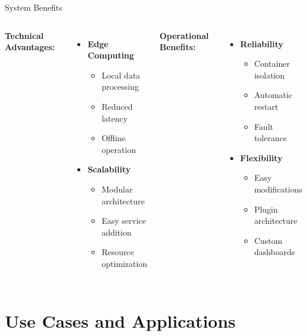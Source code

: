 \documentclass[aspectratio=169]{beamer}
\begin{document}
\begin{frame}{System Benefits}
\begin{columns}
\textbf{Technical Advantages:}
\begin{itemize}
    \item \textbf{Edge Computing}
    \begin{itemize}
        \item Local data processing
        \item Reduced latency
        \item Offline operation
    \end{itemize}
    \item \textbf{Scalability}
    \begin{itemize}
        \item Modular architecture
        \item Easy service addition
        \item Resource optimization
    \end{itemize}
\end{itemize}

\textbf{Operational Benefits:}
\begin{itemize}
    \item \textbf{Reliability}
    \begin{itemize}
        \item Container isolation
        \item Automatic restart
        \item Fault tolerance
    \end{itemize}
    \item \textbf{Flexibility}
    \begin{itemize}
        \item Easy modifications
        \item Plugin architecture
        \item Custom dashboards
    \end{itemize}
\end{itemize}
\end{columns}
\end{frame}

\section{Use Cases and Applications}
\end{document}
